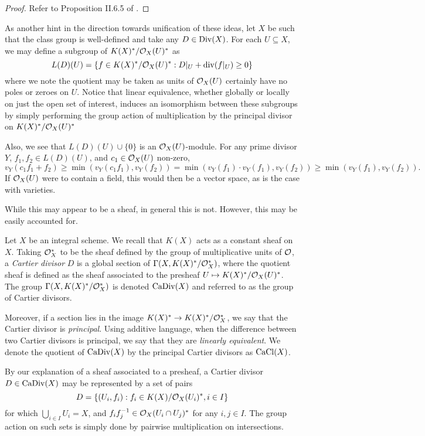 \begin{proof}
    Refer to Proposition II.6.5 of \cite{Hartshorne_2013}.
\end{proof}

As another hint in the direction towards unification of these ideas,
let $X$ be such that the class group is well-defined and take any $D \in {\rm Div}(X)$.
For each $U \subseteq X$, we may define a subgroup of $K(X)^*/\mathcal{O}_X(U)^*$ as
\[
    L(D)(U) = \{ f \in K(X)^*/\mathcal{O}_X(U)^* : D|_U + {\rm div}(f|_U) \geq 0 \}
\]
where we note the quotient may be taken as units of $\mathcal{O}_X(U)$ certainly have no poles or zeroes on $U$.
Notice that linear equivalence, whether globally or locally on just the open set of interest,
induces an isomorphism between these subgroups by simply performing the group action of multiplication by the principal divisor on $K(X)^*/\mathcal{O}_X(U)^*$ 

Also, we see that $L(D)(U) \cup \{0\}$ is an $\mathcal{O}_X(U)$-module.
For any prime divisor $Y$, $f_1, f_2 \in L(D)(U)$, and $c_1 \in \mathcal{O}_X(U)$ non-zero,
\[
    v_Y(c_1 f_1 + f_2)
    \geq \min(v_Y(c_1 f_1), v_Y(f_2))
    = \min(v_Y(f_1) \cdot v_Y(f_1), v_Y(f_2))
    \geq \min(v_Y(f_1), v_Y(f_2)).
\]
If $\mathcal{O}_X(U)$ were to contain a field, this would then be a vector space,
as is the case with varieties.

While this may appear to be a sheaf,
in general this is not.
However, this may be easily accounted for.

\begin{definition}
    Let $X$ be an integral scheme.
    We recall that $K(X)$ acts as a constant sheaf on $X$.
    Taking $\mathcal{O}_X^*$ to be the sheaf defined by the group of multiplicative units of $\mathcal{O}$,
    a \textit{Cartier divisor} $D$ is a global section of $\Gamma(X, K(X)^*/\mathcal{O}_X^*)$,
    where the quotient sheaf is defined as the sheaf associated to the presheaf $U \mapsto K(X)^*/\mathcal{O}_X(U)^*$.
    The group $\Gamma(X, K(X)^*/\mathcal{O}_X^*)$ is denoted ${\rm CaDiv}(X)$ and referred to as the group of Cartier divisors.

    Moreover, if a section lies in the image $K(X)^* \to K(X)^*/\mathcal{O}_X^*$,
    we say that the Cartier divisor is \textit{principal}.
    Using additive language, when the difference between two Cartier divisors is principal,
    we say that they are \textit{linearly equivalent}.
    We denote the quotient of ${\rm CaDiv}(X)$ by the principal Cartier divisors as ${\rm CaCl}(X)$.
\end{definition}

By our explanation of a sheaf associated to a presheaf,
a Cartier divisor $D \in {\rm CaDiv}(X)$ may be represented by a set of pairs
\[
    D = \{(U_i, f_i) : f_i \in K(X)/\mathcal{O}_X(U_i)^*, i \in I \}
\]
for which $\bigcup_{i \in I} U_i = X$,
and $f_i f_j^{-1} \in \mathcal{O}_X(U_i \cap U_j)^*$ for any $i, j \in I$.
The group action on such sets is simply done by pairwise multiplication on intersections.

